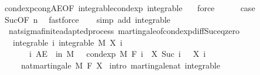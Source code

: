 \begin{isabellebody}
\ cond{\isacharunderscore}{\kern0pt}exp{\isacharunderscore}{\kern0pt}cong{\isacharunderscore}{\kern0pt}AE{\isacharbrackleft}{\kern0pt}OF\ integrable{\isacharunderscore}{\kern0pt}cond{\isacharunderscore}{\kern0pt}exp\ integrable\ {\isacharasterisk}{\kern0pt}{\isacharbrackright}{\kern0pt}\ \isamarkupfalse%
\ force\isanewline
\ \ \ \ \isamarkupfalse%
\ {\isacharquery}{\kern0pt}case\ \isamarkupfalse%
\ Suc{\isacharparenleft}{\kern0pt}{}{\isacharparenright}{\kern0pt}{\isacharbrackleft}{\kern0pt}OF\ n{\isacharbrackright}{\kern0pt}\ \isamarkupfalse%
\ fastforce\isanewline
\ \ \isamarkupfalse%
\isanewline
{}\isamarkupfalse%
\ {\isacharparenleft}{\kern0pt}simp\ add{\isacharcolon}{\kern0pt}\ integrable{\isacharparenright}{\kern0pt}%
\endisatagproof
{\isafoldproof}%
%
\isadelimproof
\isanewline
%
\endisadelimproof
\isanewline
{}\isamarkupfalse%
\ {\isacharparenleft}{\kern0pt}\ nat{\isacharunderscore}{\kern0pt}sigma{\isacharunderscore}{\kern0pt}finite{\isacharunderscore}{\kern0pt}adapted{\isacharunderscore}{\kern0pt}process{\isacharparenright}{\kern0pt}\ martingale{\isacharunderscore}{\kern0pt}of{\isacharunderscore}{\kern0pt}cond{\isacharunderscore}{\kern0pt}exp{\isacharunderscore}{\kern0pt}diff{\isacharunderscore}{\kern0pt}Suc{\isacharunderscore}{\kern0pt}eq{\isacharunderscore}{\kern0pt}zero{\isacharcolon}{\kern0pt}\isanewline
\ \ \ integrable{\isacharcolon}{\kern0pt}\ {\isachardoublequoteopen}{\isasymAnd}i{\isachardot}{\kern0pt}\ integrable\ M\ {\isacharparenleft}{\kern0pt}X\ i{\isacharparenright}{\kern0pt}{\isachardoublequoteclose}\ \isanewline
\ \ \ \ \ \ \ {\isachardoublequoteopen}{\isasymAnd}i{\isachardot}{\kern0pt}\ AE\ {\isasymxi}\ in\ M{\isachardot}{\kern0pt}\ {}\ {\isacharequal}{\kern0pt}\ cond{\isacharunderscore}{\kern0pt}exp\ M\ {\isacharparenleft}{\kern0pt}F\ i{\isacharparenright}{\kern0pt}\ {\isacharparenleft}{\kern0pt}{\isasymlambda}{\isasymxi}{\isachardot}{\kern0pt}\ X\ {\isacharparenleft}{\kern0pt}Suc\ i{\isacharparenright}{\kern0pt}\ {\isasymxi}\ {\isacharminus}{\kern0pt}\ X\ i\ {\isasymxi}{\isacharparenright}{\kern0pt}\ {\isasymxi}{\isachardoublequoteclose}\ \isanewline
\ \ \ \ \ {\isachardoublequoteopen}nat{\isacharunderscore}{\kern0pt}martingale\ M\ F\ X{\isachardoublequoteclose}\isanewline
%
\isadelimproof
%
\endisadelimproof
%
\isatagproof
{}\isamarkupfalse%
\ {\isacharparenleft}{\kern0pt}intro\ martingale{\isacharunderscore}{\kern0pt}nat\ integrable{\isacharparenright}{\kern0pt}\ \isanewline

\end{isabellebody}
